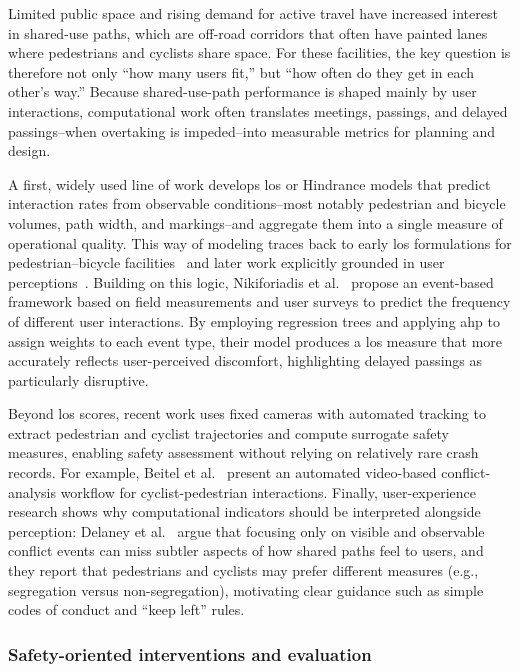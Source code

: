     Limited public space and rising demand for active travel have increased interest in shared-use paths, which are off-road corridors that often have painted lanes where pedestrians and cyclists share space. For these facilities, the key question is therefore not only ``how many users fit,'' but ``how often do they get in each other's way.'' Because shared-use-path performance is shaped mainly by user interactions, computational work often translates meetings, passings, and delayed passings--when overtaking is impeded--into measurable metrics for planning and design.

    A first, widely used line of work develops \ac{los} or Hindrance models that predict interaction rates from observable conditions--most notably pedestrian and bicycle volumes, path width, and markings--and aggregate them into a single measure of operational quality. This way of modeling traces back to early \ac{los} formulations for pedestrian--bicycle facilities~\cite{Botma1995} and later work explicitly grounded in user perceptions~\cite{Hummer2005}. Building on this logic, Nikiforiadis et al.~\cite{Nikiforiadis2020methodology} propose an event-based framework based on field measurements and user surveys to predict the frequency of different user interactions. By employing regression trees and applying \ac{ahp} to assign weights to each event type, their model produces a \ac{los} measure that more accurately reflects user-perceived discomfort, highlighting delayed passings as particularly disruptive.

    Beyond \ac{los} scores, recent work uses fixed cameras with automated tracking to extract pedestrian and cyclist trajectories and compute surrogate safety measures, enabling safety assessment without relying on relatively rare crash records. For example, Beitel et al.~\cite{Beitel2018} present an automated video-based conflict-analysis workflow for cyclist-pedestrian interactions. Finally, user-experience research shows why computational indicators should be interpreted alongside perception: Delaney et al.~\cite{Delaney2017} argue that focusing only on visible and observable conflict events can miss subtler aspects of how shared paths feel to users, and they report that pedestrians and cyclists may prefer different measures (e.g., segregation versus non-segregation), motivating clear guidance such as simple codes of conduct and ``keep left'' rules.

    
    \subsubsection{Safety-oriented interventions and evaluation}

